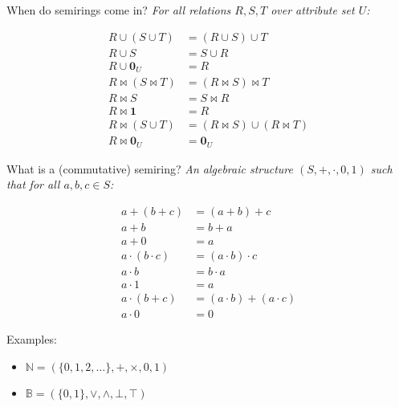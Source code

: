 \documentclass{beamer}
\begin{document}
\begin{frame}[t]{When do semirings come in?}
  \pause
  \textit{For all relations $R, S, T$ over attribute set $U$:}\\[0.3cm]
  \begin{center}
    \begin{minipage}{8.2cm}
      \begin{align*}
        R \cup (S \cup T)       & = (R \cup S) \cup T                \\
        R \cup S                & = S \cup R                         \\
        R \cup \mathbf{0}_U     & = R                                \\
        R \bowtie (S \bowtie T) & = (R \bowtie S) \bowtie T          \\
        R \bowtie S             & = S \bowtie R                      \\
        R \bowtie \mathbf{1}    & = R                                \\
        R \bowtie (S \cup T)    & = (R \bowtie S) \cup (R \bowtie T) \\
        R \bowtie \mathbf{0}_U  & = \mathbf{0}_U
      \end{align*}
    \end{minipage}
  \end{center}
\end{frame}

\begin{frame}[t]{What is a (commutative) semiring?}
  \textit{An algebraic structure $(S, +, \cdot, 0, 1)$ such that for all $a,b,c \in S$:}\\[0.3cm]
  \begin{center}
    \begin{minipage}{8.2cm}
      \begin{align*}
        a + (b + c)         & = (a + b) + c               \\
        a + b               & = b + a                     \\
        a + 0               & = a                         \\
        a \cdot (b \cdot c) & = (a \cdot b) \cdot c       \\
        a \cdot b           & = b \cdot a                 \\
        a \cdot 1           & = a                         \\
        a \cdot (b + c)     & = (a \cdot b) + (a \cdot c) \\
        a \cdot 0           & = 0
      \end{align*}
    \end{minipage}
  \end{center}
  \pause
  Examples:
  \begin{itemize}
    \item $\mathbb{N} = (\{0,1,2,\dots\}, +, \times, 0, 1)$
    \item $\mathbb{B} = (\{0, 1\}, \lor, \land, \bot, \top)$
  \end{itemize}
\end{frame}
\end{document}
